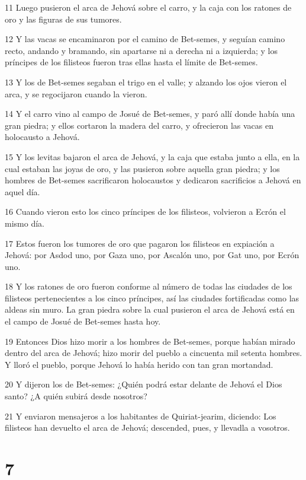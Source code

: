 \par 11 Luego pusieron el arca de Jehová sobre el carro, y la caja con los ratones de oro y las figuras de sus tumores.
\par 12 Y las vacas se encaminaron por el camino de Bet-semes, y seguían camino recto, andando y bramando, sin apartarse ni a derecha ni a izquierda; y los príncipes de los filisteos fueron tras ellas hasta el límite de Bet-semes.
\par 13 Y los de Bet-semes segaban el trigo en el valle; y alzando los ojos vieron el arca, y se regocijaron cuando la vieron.
\par 14 Y el carro vino al campo de Josué de Bet-semes, y paró allí donde había una gran piedra; y ellos cortaron la madera del carro, y ofrecieron las vacas en holocausto a Jehová.
\par 15 Y los levitas bajaron el arca de Jehová, y la caja que estaba junto a ella, en la cual estaban las joyas de oro, y las pusieron sobre aquella gran piedra; y los hombres de Bet-semes sacrificaron holocaustos y dedicaron sacrificios a Jehová en aquel día.
\par 16 Cuando vieron esto los cinco príncipes de los filisteos, volvieron a Ecrón el mismo día.
\par 17 Estos fueron los tumores de oro que pagaron los filisteos en expiación a Jehová: por Asdod uno, por Gaza uno, por Ascalón uno, por Gat uno, por Ecrón uno.
\par 18 Y los ratones de oro fueron conforme al número de todas las ciudades de los filisteos pertenecientes a los cinco príncipes, así las ciudades fortificadas como las aldeas sin muro. La gran piedra sobre la cual pusieron el arca de Jehová está en el campo de Josué de Bet-semes hasta hoy.
\par 19 Entonces Dios hizo morir a los hombres de Bet-semes, porque habían mirado dentro del arca de Jehová; hizo morir del pueblo a cincuenta mil setenta hombres. Y lloró el pueblo, porque Jehová lo había herido con tan gran mortandad.
\par 20 Y dijeron los de Bet-semes: ¿Quién podrá estar delante de Jehová el Dios santo? ¿A quién subirá desde nosotros?
\par 21 Y enviaron mensajeros a los habitantes de Quiriat-jearim, diciendo: Los filisteos han devuelto el arca de Jehová; descended, pues, y llevadla a vosotros.

\chapter{7}

